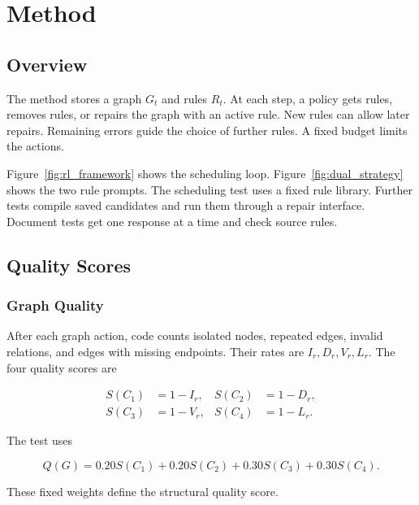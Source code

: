 \section{Method}

\label{sec:methodology}

\subsection{Overview}

The method stores a graph $G_t$ and rules $R_t$. At each step, a policy
gets rules, removes rules, or repairs the graph with an active rule.
New rules can allow later repairs. Remaining errors guide the choice
of further rules. A fixed budget limits the actions.

Figure~\ref{fig:rl_framework} shows the scheduling loop.
Figure~\ref{fig:dual_strategy} shows the two rule prompts.
The scheduling test uses a fixed rule library. Further tests compile
saved candidates and run them through a repair interface. Document tests
get one response at a time and check source rules.

\subsection{Quality Scores}

\label{subsec:quality_model}

\subsubsection{Graph Quality}

After each graph action, code counts isolated nodes, repeated edges,
invalid relations, and edges with missing endpoints. Their rates are
$I_r,D_r,V_r,L_r$. The four quality scores are

\begin{equation}
\begin{aligned} S(C_1)&=1-I_r,& S(C_2)&=1-D_r,\\ S(C_3)&=1-V_r,& S(C_4)&=1-L_r.\end{aligned}
\end{equation}

The test uses

\begin{equation}
\label{eq:kg_quality}
Q(G)=0.20S(C_1)+0.20S(C_2)+0.30S(C_3)+0.30S(C_4).
\end{equation}

These fixed weights define the structural quality score.

